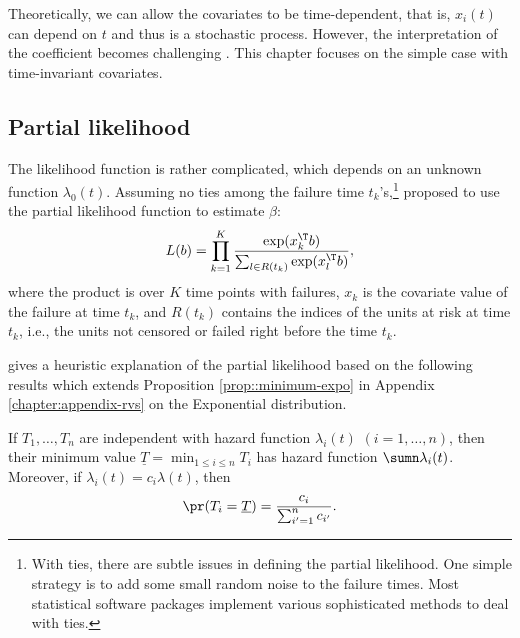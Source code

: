 Theoretically, we can allow the covariates to be time-dependent, that is, $x_i(t)$ can depend on $t$ and thus is a stochastic process. However, the interpretation of the coefficient becomes challenging \citep{fisher1999time}. This chapter focuses on the simple case with time-invariant covariates. 




\subsection{Partial likelihood}


The likelihood function is rather complicated, which depends on an unknown function $\lambda_0(t)$. 
Assuming no ties among the failure time $t_k$'s,\footnote{
With ties, there are subtle issues in defining the partial likelihood. One simple strategy is to add some small random noise to the failure times. Most statistical software packages implement various sophisticated methods to deal with ties.
} \citet{cox1972regression} proposed to use the partial likelihood function
to estimate $\beta$:
\[
L(b)=\prod_{k=1}^{K}\frac{\exp(x_{k}^{\T} b)}{\sum_{l\in R(t_{k})}\exp(x_{l}^{\T} b)},
\]
where the product is over $K$ time points with failures, $x_k$ is the covariate value of the failure at time $t_k$, and $R(t_k)$ contains the indices of the units at risk at time $t_k$, i.e., the units not censored or failed right before the time $t_k$. 


\citet{freedman2008survival} gives a heuristic explanation of the partial likelihood based on the following results which extends Proposition \ref{prop::minimum-expo} in Appendix \ref{chapter:appendix-rvs} on the Exponential distribution. 

\begin{theorem}
\label{thm::freedman-explain-cox}
If $T_1,\ldots, T_n$ are independent with hazard function $\lambda_i(t)$ $(i=1,\ldots, n)$, then their minimum value $\underline{T} = \min_{1\leq i \leq n} T_i$ has hazard function $\sumn \lambda_i(t)$.
Moreover, if $\lambda_i(t) = c_i \lambda(t)$, then 
$$
\pr (  T_i = \underline{T}  ) = \frac{c_i}{ \sum_{i'=1}^n  c_{i'} }.
$$
\end{theorem} 

